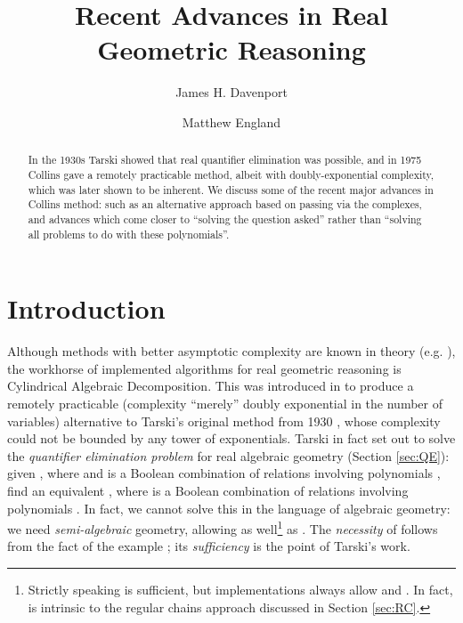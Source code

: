 \documentclass[runningheads,a4paper]{llncs}
\begin{document}
\mainmatter





\title{Recent Advances in Real Geometric Reasoning}  
\author{James H. Davenport \and Matthew England}






\maketitle
\begin{abstract}
In the 1930s Tarski showed that real quantifier elimination was possible, and in 1975 Collins gave a remotely practicable method, albeit with doubly-exponential complexity, which was later shown to be inherent. We discuss some of the recent major advances in Collins method: such as an alternative approach based on passing via the complexes, and advances which come closer to ``solving the question asked'' rather than ``solving all problems to do with these polynomials''.
\end{abstract}

\section{Introduction}

Although methods with better asymptotic complexity are known in theory (e.g. \cite{GrigorievVorobjov1988a}), the workhorse of implemented algorithms for real geometric reasoning is Cylindrical Algebraic Decomposition. This was introduced in \cite{Collins1975} to produce a remotely practicable (complexity ``merely'' doubly exponential in the number of variables) alternative to Tarski's original method from 1930 \cite{Tarski1951}, whose complexity could not be bounded by any tower of exponentials. Tarski in fact set out to solve the \emph{quantifier elimination problem} for real algebraic geometry (Section \ref{sec:QE}): given , where  and  is a Boolean combination of relations involving polynomials , find an equivalent , where  is a Boolean combination of relations involving polynomials . In fact, we cannot solve this in the language of algebraic geometry: we need \emph{semi-algebraic} geometry, allowing  as well\footnote{Strictly speaking  is sufficient, but implementations always allow  and . In fact,  is intrinsic to the regular chains approach discussed in Section \ref{sec:RC}.} as . The \emph{necessity} of  follows from the fact of the example ; its \emph{sufficiency} is the point of Tarski's work.
\end{document}
